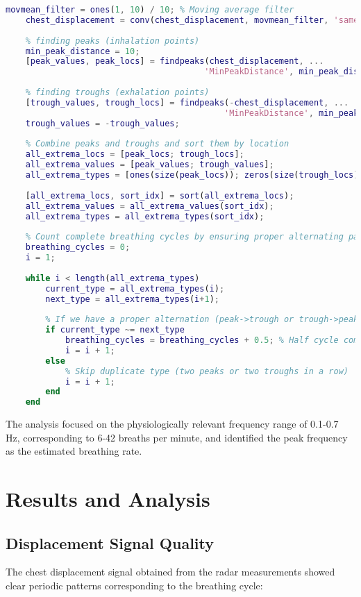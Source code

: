 \documentclass[12pt]{article}
\begin{document}
\begin{lstlisting}[language=Matlab]
    movmean_filter = ones(1, 10) / 10; % Moving average filter
    chest_displacement = conv(chest_displacement, movmean_filter, 'same');
    
    % finding peaks (inhalation points)
    min_peak_distance = 10;
    [peak_values, peak_locs] = findpeaks(chest_displacement, ...
                                        'MinPeakDistance', min_peak_distance);
    
    % finding troughs (exhalation points)
    [trough_values, trough_locs] = findpeaks(-chest_displacement, ...
                                            'MinPeakDistance', min_peak_distance);
    trough_values = -trough_values;
    
    % Combine peaks and troughs and sort them by location
    all_extrema_locs = [peak_locs; trough_locs];
    all_extrema_values = [peak_values; trough_values];
    all_extrema_types = [ones(size(peak_locs)); zeros(size(trough_locs))]; % 1 for peaks, 0 for troughs
    
    [all_extrema_locs, sort_idx] = sort(all_extrema_locs);
    all_extrema_values = all_extrema_values(sort_idx);
    all_extrema_types = all_extrema_types(sort_idx);
    
    % Count complete breathing cycles by ensuring proper alternating pattern
    breathing_cycles = 0;
    i = 1;
    
    while i < length(all_extrema_types)
        current_type = all_extrema_types(i);
        next_type = all_extrema_types(i+1);
        
        % If we have a proper alternation (peak->trough or trough->peak)
        if current_type ~= next_type
            breathing_cycles = breathing_cycles + 0.5; % Half cycle completed
            i = i + 1;
        else
            % Skip duplicate type (two peaks or two troughs in a row)
            i = i + 1;
        end
    end
\end{lstlisting}

The analysis focused on the physiologically relevant frequency range of 0.1-0.7 Hz, corresponding to 6-42 breaths per minute, and identified the peak frequency as the estimated breathing rate.

\section{Results and Analysis}

\subsection{Displacement Signal Quality}
The chest displacement signal obtained from the radar measurements showed clear periodic patterns corresponding to the breathing cycle:
\end{document}
